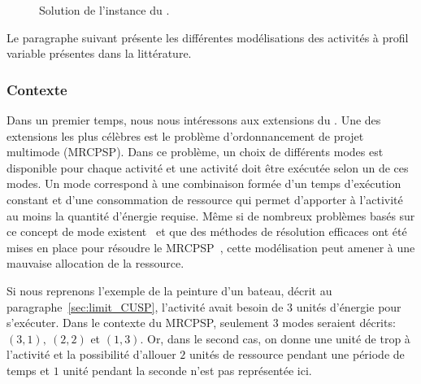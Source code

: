 \begin{ex}
\begin{figure}[!htb]
\centering
{}
\caption{Solution de l'instance du \CECSP.}
\label{sol_ex_CECSP}
\end{figure}
\end{ex}

Le paragraphe suivant présente les différentes modélisations des
activités à profil variable présentes dans la
littérature.

\subsubsection{Contexte}


Dans un premier temps, nous nous intéressons aux extensions du
\RCPSP. Une des extensions les plus célèbres est le problème
d'ordonnancement de projet multimode (MRCPSP). Dans ce problème, un
choix de différents modes est disponible pour chaque activité et une
activité doit être exécutée selon un de ces modes. Un mode correspond
à une combinaison formée d'un temps d'exécution constant et d'une
consommation de ressource qui permet d'apporter à l'activité au moins
la quantité d'énergie requise. Même si de nombreux problèmes basés sur
ce concept de mode existent~\cite{DDH,RK,RDK,DD} et que des méthodes
de résolution efficaces ont été mises en place pour résoudre le
MRCPSP~\cite{PV}, cette modélisation peut amener à une mauvaise
allocation de la ressource.

Si nous reprenons l'exemple de la peinture d'un bateau,
décrit au paragraphe~\ref{sec:limit_CUSP}, l'activité avait besoin de
$3$ unités d'énergie pour s'exécuter. Dans le contexte du MRCPSP,
seulement $3$ modes seraient décrits: $(3,1),\ (2,2)$ et $(1,3)$. Or,
dans le second cas, on donne une unité de trop à l'activité et la
possibilité d'allouer $2$ unités de ressource pendant une période de
temps et $1$ unité pendant la seconde n'est pas représentée ici. 

